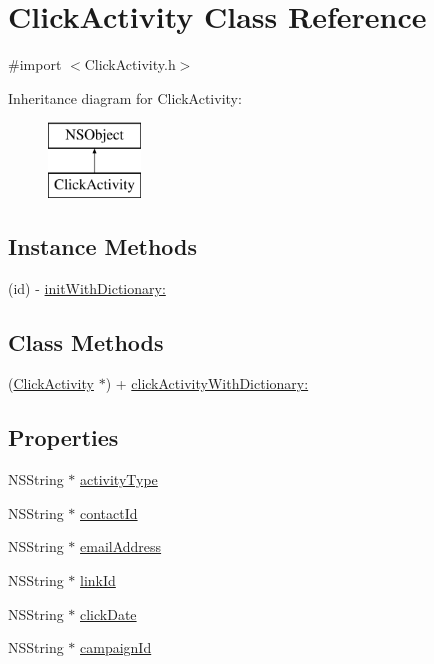 \hypertarget{interface_click_activity}{\section{Click\-Activity Class Reference}
\label{interface_click_activity}
}


{\ttfamily \#import $<$Click\-Activity.\-h$>$}

Inheritance diagram for Click\-Activity\-:\begin{figure}[H]
\begin{center}
\leavevmode
\includegraphics[height=2.000000cm]{interface_click_activity}
\end{center}
\end{figure}
\subsection*{Instance Methods}
\begin{DoxyCompactItemize}
\item 
(id) -\/ \hyperlink{interface_click_activity_a933595e83a8420e68c26b7949df6bf6a}{init\-With\-Dictionary\-:}
\end{DoxyCompactItemize}
\subsection*{Class Methods}
\begin{DoxyCompactItemize}
\item 
(\hyperlink{interface_click_activity}{Click\-Activity} $\ast$) + \hyperlink{interface_click_activity_a7a45bde632965a78443ee661bd2ae061}{click\-Activity\-With\-Dictionary\-:}
\end{DoxyCompactItemize}
\subsection*{Properties}
\begin{DoxyCompactItemize}
\item 
N\-S\-String $\ast$ \hyperlink{interface_click_activity_a5b7f3e287a9bde218b6d571a338d29af}{activity\-Type}
\item 
N\-S\-String $\ast$ \hyperlink{interface_click_activity_a43778e834519d609722b7694e4d12d39}{contact\-Id}
\item 
N\-S\-String $\ast$ \hyperlink{interface_click_activity_ac23f733678933938130fc10f72288911}{email\-Address}
\item 
N\-S\-String $\ast$ \hyperlink{interface_click_activity_a19803f5ea19ba2bcef1842d19886373c}{link\-Id}
\item 
N\-S\-String $\ast$ \hyperlink{interface_click_activity_ac525ca9838221a3f62594a5783060c0c}{click\-Date}
\item 
N\-S\-String $\ast$ \hyperlink{interface_click_activity_a15b782c8f0a91e45a23ef474032bf03a}{campaign\-Id}
\end{DoxyCompactItemize}


